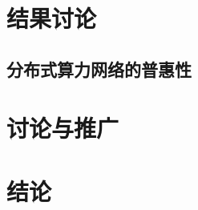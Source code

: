 \clearpage
\section{结果讨论}\label{sec:results}

\subsection{分布式算力网络的普惠性}\label{sec:inclusion}

\section{讨论与推广}\label{sec:promotion}

\section{结论}\label{sec:conclusion}
